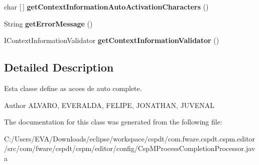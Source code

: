 \begin{DoxyCompactItemize}
char \mbox{[}$\,$\mbox{]} {\bfseries get\+Context\+Information\+Auto\+Activation\+Characters} ()
\item 
\mbox{\label{classcom_1_1fware_1_1cspdt_1_1cspm_1_1editor_1_1config_1_1_csp_m_process_completion_processor_af9a6c3c1da9d2de7726bd9f3802ff05b}} 
String {\bfseries get\+Error\+Message} ()
\item 
\mbox{\label{classcom_1_1fware_1_1cspdt_1_1cspm_1_1editor_1_1config_1_1_csp_m_process_completion_processor_ae564757118503ad570ea14fed78988c3}} 
I\+Context\+Information\+Validator {\bfseries get\+Context\+Information\+Validator} ()
\end{DoxyCompactItemize}


\subsection{Detailed Description}
Esta classe define as acoes de auto complete. 

\begin{DoxyAuthor}{Author}
A\+L\+V\+A\+RO, E\+V\+E\+R\+A\+L\+DA, F\+E\+L\+I\+PE, J\+O\+N\+A\+T\+H\+AN, J\+U\+V\+E\+N\+AL 
\end{DoxyAuthor}


The documentation for this class was generated from the following file\+:\begin{DoxyCompactItemize}
\item 
C\+:/\+Users/\+E\+V\+A/\+Downloads/eclipse/workspace/cspdt/com.\+fware.\+cspdt.\+cspm.\+editor/src/com/fware/cspdt/cspm/editor/config/Csp\+M\+Process\+Completion\+Processor.\+java\end{DoxyCompactItemize}
